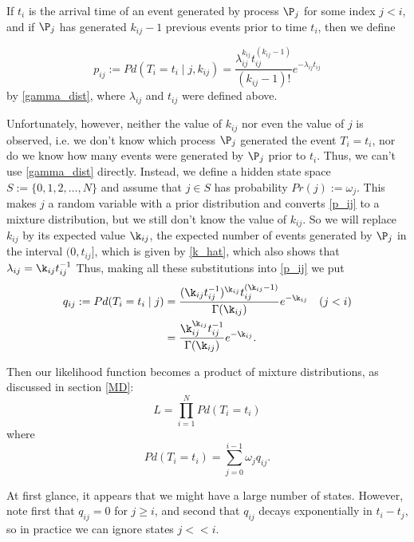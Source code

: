 \documentclass[12pt,leqno]{article}
\begin{document}
If $t_i$ is the arrival time of an event generated by process $\P_j$ for some index $j < i$, and
if $\P_j$ has generated $k_{ij}-1$ previous events prior to time $t_i$, then we define 

\begin{equation}\label{p_ij}
  p_{ij} :=  Pd(T_i = t_i \mid j, k_{ij}) = \frac{\lambda_{ij}^{k_{ij}}t_{ij}^{(k_{ij}-1)}}{(k_{ij}-1)!}e^{-\lambda_{ij}t_{ij}}
\end{equation}
by \eqref{gamma_dist}, where $\lambda_{ij}$ and $t_{ij}$ were defined above.

Unfortunately, however, neither the value of $k_{ij}$ nor even the value of $j$ is  observed, i.e. we don't know
which process $\P_j$ generated the event $T_i = t_i$, nor do we know how many events were generated by $\P_j$
prior to $t_i$.  Thus, we can't use \eqref{gamma_dist} directly. Instead,
we define a hidden state space $S := \{0,1,2,\dots,N\}$ and assume that $j\in{S}$ has probability $Pr(j) := \omega_j$.
This makes $j$ a random variable with a prior distribution and converts \eqref{p_ij} to a mixture distribution, but
we still don't know the value of $k_{ij}$.  So we
will replace $k_{ij}$ by its expected value $\k_{ij}$, the expected number of events generated by $\P_j$
in the interval $(0,t_{ij}]$, which is  given by \eqref{k_hat}, which also shows that $\lambda_{ij} = \k_{ij}t_{ij}^{-1}$
Thus, making all these substitutions into \eqref{p_ij} we put
\begin{equation}\label{q_ij}
  \begin{split}
    q_{ij} := Pd(T_i = t_i \mid j) &= \frac{(\k_{ij}t_{ij}^{-1})^{\k_{ij}}t_{ij}^{(\k_{ij}-1)}}{\Gamma(\k_{ij})}e^{-\k_{ij}}\quad (j < i)\\
    &= \frac{\k_{ij}^{\k_{ij}}t_{ij}^{-1}}{\Gamma(\k_{ij})}e^{-\k_{ij}}.
  \end{split}
\end{equation}

Then our likelihood function becomes a product of mixture distributions, as discussed in section \eqref{MD}:
$$
L = \prod_{i=1}^NPd(T_i = t_i)
$$
where 
\begin{equation}\label{likelihood}
    Pd(T_i = t_i) = \sum_{j=0}^{i-1}\omega_jq_{ij}.
\end{equation}

At first glance, it appears that we might have a large number of states.  However, note first that $q_{ij} = 0$ for $j \ge i$, and second that $q_{ij}$ decays exponentially in $t_i-t_j$, so in practice we can ignore states $j << i$.
\end{document}
